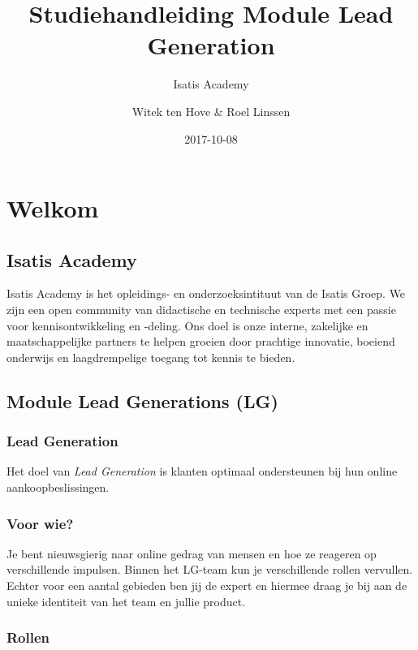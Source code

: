 \documentclass[]{book}
\title{Studiehandleiding Module Lead Generation}
\subtitle{Isatis Academy}
\author{Witek ten Hove \& Roel Linssen}
\date{2017-10-08}
\begin{document}
\maketitle

{
\setcounter{tocdepth}{1}
\tableofcontents
}
\chapter{Welkom}\label{welkom}

\section{Isatis Academy}\label{isatis-academy}

Isatis Academy is het opleidings- en onderzoeksintituut van de Isatis
Groep. We zijn een open community van didactische en technische experts
met een passie voor kennisontwikkeling en -deling. Ons doel is onze
interne, zakelijke en maatschappelijke partners te helpen groeien door
prachtige innovatie, boeiend onderwijs en laagdrempelige toegang tot
kennis te bieden.

\section{Module Lead Generations (LG)}\label{module-lead-generations-lg}

\subsection{Lead Generation}\label{lead-generation}

Het doel van \emph{Lead Generation} is klanten optimaal ondersteunen bij
hun online aankoopbeslissingen.

\subsection{Voor wie?}\label{voor-wie}

Je bent nieuwsgierig naar online gedrag van mensen en hoe ze reageren op
verschillende impulsen. Binnen het LG-team kun je verschillende rollen
vervullen. Echter voor een aantal gebieden ben jij de expert en hiermee
draag je bij aan de unieke identiteit van het team en jullie product.

\subsection{Rollen}\label{rollen}
\end{document}
